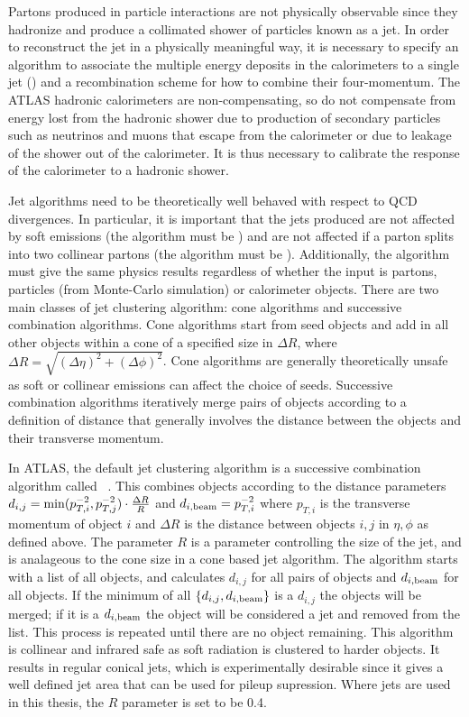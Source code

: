 Partons produced in particle interactions are not physically observable since
they hadronize and produce a collimated shower of particles known as a jet. In
order to reconstruct the jet in a physically meaningful way, it is necessary to
specify an algorithm to associate the multiple energy deposits in the calorimeters
to a single jet () and a recombination scheme for how to combine their
four-momentum. The ATLAS hadronic calorimeters are non-compensating, so do not
compensate from energy lost from the hadronic shower due to production of
secondary particles such as neutrinos and muons that escape from the calorimeter
or due to leakage of the shower out of the calorimeter. It is thus necessary to
calibrate the response of the calorimeter to a hadronic shower.

Jet algorithms need to be theoretically well behaved with respect to QCD
divergences. In particular, it is important that the jets produced are not
affected by soft emissions (the algorithm must be ) and
are not affected if a parton splits into two collinear partons (the algorithm
must be ). Additionally, the algorithm must give the same
physics results regardless of whether the input is partons, particles (from
Monte-Carlo simulation) or calorimeter objects. There are two main classes of
jet clustering algorithm: cone algorithms and successive combination algorithms.
Cone algorithms start from seed objects and add in all other objects within a
cone of a specified size in $\Delta R$, where $\Delta R = \sqrt{(\Delta \eta)^{2} + (\Delta
\phi)^{2}} $. Cone algorithms are generally theoretically unsafe as soft or
collinear emissions can affect the choice of seeds. Successive combination
algorithms iteratively merge pairs of objects according to a definition of distance that
generally involves the distance between the objects and their transverse
momentum.

In ATLAS, the default jet clustering algorithm is a successive combination
algorithm called \antikt~\cite{1126-6708-2008-04-063}. This combines objects
according to the distance parameters $d_{i,j} =
{\rm min}(p_{T,i}^{-2},p_{T,j}^{-2}) \cdot \frac{ \Delta R }{R}$ and $d_{i,\rm{beam}} =
p_{T,i}^{-2}$ where $p_{T,i}$ is the transverse momentum of object $i$ and
$\Delta R$ is the distance between objects $i,j$ in $\eta, \phi$ as defined above.
The parameter $R$ is a parameter controlling the size of the jet, and is
analageous to the cone size in a cone based jet algorithm. The algorithm starts
with a list of all objects, and calculates $d_{i,j}$ for all pairs of objects and
$d_{i,{\rm beam}}$ for all objects. If the minimum of all $\{ d_{i,j}, d_{i,{\rm
beam}} \}$ is a  $d_{i,j}$ the objects will be merged; if it is a $ d_{i,{\rm
beam}}$ the object will be considered a jet and removed from the list. This
process is repeated until there are no object remaining. This algorithm is
collinear and infrared safe as soft radiation is clustered to harder objects. 
It results in regular conical jets, which is experimentally desirable
since it gives a well defined jet area that can be used for pileup supression.
Where jets are used in this thesis, the $R$ parameter is set to be 0.4.

